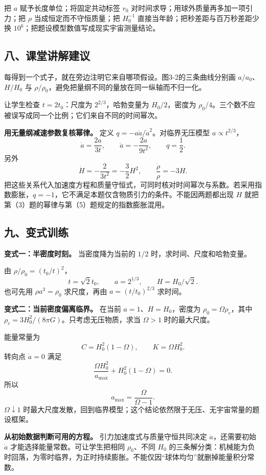\documentclass[12pt,a4paper,UTF8]{ctexart}
\begin{document}
把 \(a\) 赋予长度单位；将固定共动标签 \(r_0\)
对时间求导；用球外质量再多加一项引力；把 \(\rho\)
当成恒定而不守恒质量；把 \(H_0^{-1}\)
直接当年龄；把秒差距与百万秒差距少换
\(10^6\)；把题设模型数值写成现实宇宙测量结论。

\subsection{八、课堂讲解建议}\label{ux516bux8bfeux5802ux8bb2ux89e3ux5efaux8bae-2}

每得到一个式子，就在旁边注明它来自哪项假设。图3-2的三条曲线分别画
\(a/a_0\)、\(H/H_0\) 与
\(\rho/\rho_0\)，避免把量纲不同的量放在同一纵轴而不归一化。

让学生检查 \(t=2t_0\)：尺度为 \(2^{2/3}\)，哈勃变量为 \(H_0/2\)，密度为
\(\rho_0/4\)。三个数不应被误写成同一个比例；它们来自不同的时间幂次。

\textbf{用无量纲减速参数复核幂律。} 定义
\(q=-a\ddot a/\dot a^2\)。对临界无压模型 \(a\propto t^{2/3}\)， \[
\dot a=\frac{2a}{3t},\qquad
\ddot a=-\frac{2a}{9t^2},
\qquad \boxed{q=\frac12}.
\] 另外 \[
\dot H=-\frac{2}{3t^2}=-\frac32H^2,
\qquad \frac{\dot\rho}{\rho}=-3H.
\]
把这些关系代入加速度方程和质量守恒式，可同时核对时间幂次与系数。若采用指数膨胀，\(q=-1\)，它不满足本题仅含物质引力的条件。不能因两题都出现
\(H\) 就把第（3）题的幂律与第（5）题规定的指数膨胀混用。

\subsection{九、变式训练}\label{ux4e5dux53d8ux5f0fux8badux7ec3-2}

\textbf{变式一：半密度时刻。} 当密度降为当前的 \(1/2\)
时，求时间、尺度和哈勃变量。

由 \(\rho/\rho_0=(t_0/t)^2\)， \[
\boxed{t=\sqrt2t_0},
\qquad
\boxed{a=2^{1/3}},
\qquad
\boxed{H=H_0/\sqrt2}.
\] 也可先用 \(\rho a^3=\rho_0\) 求尺度，再由 \(a=(t/t_0)^{2/3}\)
求时间。

\textbf{变式二：当前密度偏离临界。} 在当前 \(a=1\)、\(H=H_0\)，密度为
\(\rho_0=\Omega\rho_c\)，其中
\(\rho_c=3H_0^2/(8\pi G)\)。只考虑无压物质，求当 \(\Omega>1\)
时的最大尺度。

能量常量为 \[
C=H_0^2(1-\Omega),
\qquad K=\Omega H_0^2.
\] 转向点 \(\dot a=0\) 满足 \[
\frac{\Omega H_0^2}{a_{\max}}+H_0^2(1-\Omega)=0.
\] 所以 \[
\boxed{a_{\max}=\frac{\Omega}{\Omega-1}}.
\] \(\Omega\downarrow1\)
时最大尺度发散，回到临界模型；这个结论依然限于无压、无宇宙常量的题设框架。

\textbf{从初始数据判断可用的方程。} 引力加速度式与质量守恒共同决定
\(\ddot a\)，还需要初始 \(\dot a\) 才能选择能量常数。可让学生把相同
\(\rho_0\)、不同 \(H_0\)
的三条解分类：机械能为负时回落，为零时临界，为正时持续膨胀。不能仅因``球体均匀''就删掉能量积分常数。
\end{document}
